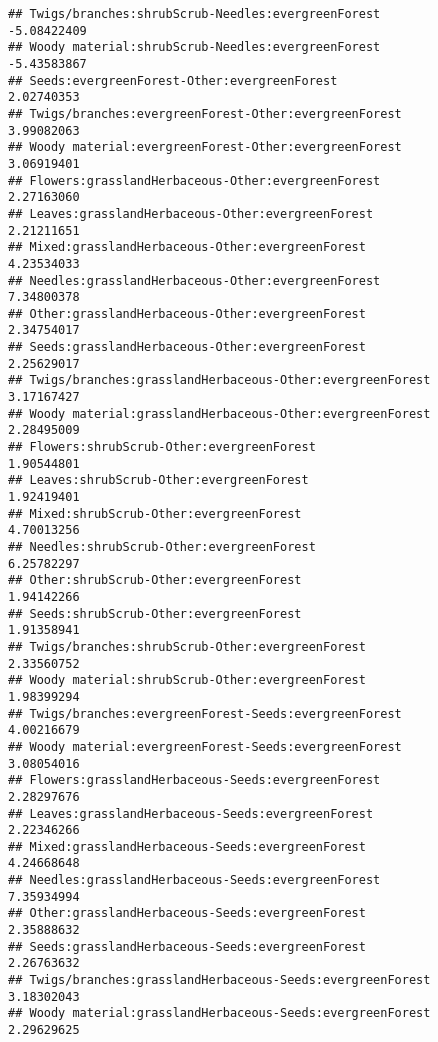 \documentclass[
]{article}
\begin{document}
\begin{verbatim}
## Twigs/branches:shrubScrub-Needles:evergreenForest                     -5.08422409
## Woody material:shrubScrub-Needles:evergreenForest                     -5.43583867
## Seeds:evergreenForest-Other:evergreenForest                            2.02740353
## Twigs/branches:evergreenForest-Other:evergreenForest                   3.99082063
## Woody material:evergreenForest-Other:evergreenForest                   3.06919401
## Flowers:grasslandHerbaceous-Other:evergreenForest                      2.27163060
## Leaves:grasslandHerbaceous-Other:evergreenForest                       2.21211651
## Mixed:grasslandHerbaceous-Other:evergreenForest                        4.23534033
## Needles:grasslandHerbaceous-Other:evergreenForest                      7.34800378
## Other:grasslandHerbaceous-Other:evergreenForest                        2.34754017
## Seeds:grasslandHerbaceous-Other:evergreenForest                        2.25629017
## Twigs/branches:grasslandHerbaceous-Other:evergreenForest               3.17167427
## Woody material:grasslandHerbaceous-Other:evergreenForest               2.28495009
## Flowers:shrubScrub-Other:evergreenForest                               1.90544801
## Leaves:shrubScrub-Other:evergreenForest                                1.92419401
## Mixed:shrubScrub-Other:evergreenForest                                 4.70013256
## Needles:shrubScrub-Other:evergreenForest                               6.25782297
## Other:shrubScrub-Other:evergreenForest                                 1.94142266
## Seeds:shrubScrub-Other:evergreenForest                                 1.91358941
## Twigs/branches:shrubScrub-Other:evergreenForest                        2.33560752
## Woody material:shrubScrub-Other:evergreenForest                        1.98399294
## Twigs/branches:evergreenForest-Seeds:evergreenForest                   4.00216679
## Woody material:evergreenForest-Seeds:evergreenForest                   3.08054016
## Flowers:grasslandHerbaceous-Seeds:evergreenForest                      2.28297676
## Leaves:grasslandHerbaceous-Seeds:evergreenForest                       2.22346266
## Mixed:grasslandHerbaceous-Seeds:evergreenForest                        4.24668648
## Needles:grasslandHerbaceous-Seeds:evergreenForest                      7.35934994
## Other:grasslandHerbaceous-Seeds:evergreenForest                        2.35888632
## Seeds:grasslandHerbaceous-Seeds:evergreenForest                        2.26763632
## Twigs/branches:grasslandHerbaceous-Seeds:evergreenForest               3.18302043
## Woody material:grasslandHerbaceous-Seeds:evergreenForest               2.29629625

\end{verbatim}
\end{document}
